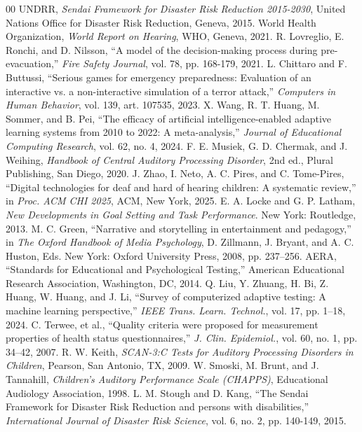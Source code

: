 \documentclass[conference]{IEEEtran}
\begin{document}
\begin{thebibliography}{00}
 UNDRR, \textit{Sendai Framework for Disaster Risk Reduction 2015-2030}, United Nations Office for Disaster Risk Reduction, Geneva, 2015.
 World Health Organization, \textit{World Report on Hearing}, WHO, Geneva, 2021.
 R. Lovreglio, E. Ronchi, and D. Nilsson, ``A model of the decision-making process during pre-evacuation,'' \textit{Fire Safety Journal}, vol. 78, pp. 168-179, 2021.
 L. Chittaro and F. Buttussi, ``Serious games for emergency preparedness: Evaluation of an interactive vs. a non-interactive simulation of a terror attack,'' \textit{Computers in Human Behavior}, vol. 139, art. 107535, 2023.
 X. Wang, R. T. Huang, M. Sommer, and B. Pei, ``The efficacy of artificial intelligence-enabled adaptive learning systems from 2010 to 2022: A meta-analysis,'' \textit{Journal of Educational Computing Research}, vol. 62, no. 4, 2024.
 F. E. Musiek, G. D. Chermak, and J. Weihing, \textit{Handbook of Central Auditory Processing Disorder}, 2nd ed., Plural Publishing, San Diego, 2020.
 J. Zhao, I. Neto, A. C. Pires, and C. Tome-Pires, ``Digital technologies for deaf and hard of hearing children: A systematic review,'' in \textit{Proc. ACM CHI 2025}, ACM, New York, 2025.
 E. A. Locke and G. P. Latham, \textit{New Developments in Goal Setting and Task Performance}. New York: Routledge, 2013.
 M. C. Green, ``Narrative and storytelling in entertainment and pedagogy,'' in \textit{The Oxford Handbook of Media Psychology}, D. Zillmann, J. Bryant, and A. C. Huston, Eds. New York: Oxford University Press, 2008, pp. 237--256.
 AERA, ``Standards for Educational and Psychological Testing,'' American Educational Research Association, Washington, DC, 2014.
 Q. Liu, Y. Zhuang, H. Bi, Z. Huang, W. Huang, and J. Li, ``Survey of computerized adaptive testing: A machine learning perspective,'' \textit{IEEE Trans. Learn. Technol.}, vol. 17, pp. 1--18, 2024.
 C. Terwee, et al., ``Quality criteria were proposed for measurement properties of health status questionnaires,'' \textit{J. Clin. Epidemiol.}, vol. 60, no. 1, pp. 34--42, 2007.
 R. W. Keith, \textit{SCAN-3:C Tests for Auditory Processing Disorders in Children}, Pearson, San Antonio, TX, 2009.
 W. Smoski, M. Brunt, and J. Tannahill, \textit{Children's Auditory Performance Scale (CHAPPS)}, Educational Audiology Association, 1998.
 L. M. Stough and D. Kang, ``The Sendai Framework for Disaster Risk Reduction and persons with disabilities,'' \textit{International Journal of Disaster Risk Science}, vol. 6, no. 2, pp. 140-149, 2015.
\end{thebibliography}
\end{document}
